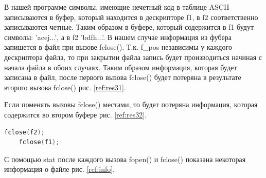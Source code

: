 \documentclass[a4paper,oneside,12pt]{extreport}
\begin{document}
\begin{task}
    В нашей программе символы, имеющие нечетный код в таблице ASCII
    записываются в буфер, который находится в дескрипторе f1, 
    в f2 соответственно записываются четные. 
    Таким образом в буфере, который содержится в f1 будут символы: 'acej...', 
    а в f2 'bdfh...'.
    В нашем случае информация из фубера запишется в файл при вызове fclose().
    Т.к. f\_pos независимы у каждого дескриптора файла, то при закрытии файла
    запись будет производиться начиная с начала файла в обоих случаях.
    Таким образом информация, которая будет записана в файл, после первого вызова
    fclose() будет потеряна в результате второго вызова fclose() рис. \ref{ref:res31}.   
   
    \begin{figure}[ht!]
    \end{figure}

    Если поменять вызовы fclose() местами, то будет потеряна информация,
    которая содержится во втором буфере рис. \ref{ref:res32}.
    \begin{lstlisting}[language=C]
    fclose(f2);
    fclose(f1);
    \end{lstlisting}

    \begin{figure}[ht!]
    \end{figure}

    \newpage
    С помощью stat после каждого вызова fopen() и fclose()
    показана некоторая информация о файле рис. \ref{ref:info}. 

    \begin{figure}[ht!]
    \end{figure}


\end{task}
\end{document}
